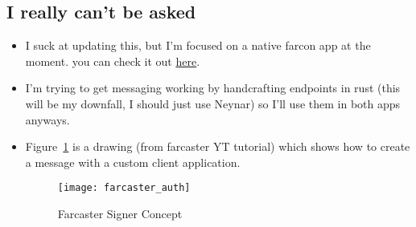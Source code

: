 \subsection*{I really can't be asked}
\begin{itemize}
    \item I suck at updating this, but I'm focused on a native farcon app at the
        moment. you can check it out
        \textcolor{blue}{\href{https://farcon.info}{here}}.
    \item I'm trying to get messaging working by handcrafting endpoints in rust
        (this will be my downfall, I should just use Neynar) so I'll use them in
        both apps anyways.
    \item Figure~\ref{fig:farcaster_auth} is a drawing (from farcaster YT 
        tutorial) which shows how to create a message with a custom client 
        application.
        \begin{figure}[ht]
            \centering
            \texttt{[image: farcaster\_auth]}
            \captionsetup{labelfont=bf, textfont=it}
            \caption{Farcaster Signer Concept}
            \label{fig:farcaster_auth}
        \end{figure}
\end{itemize}

